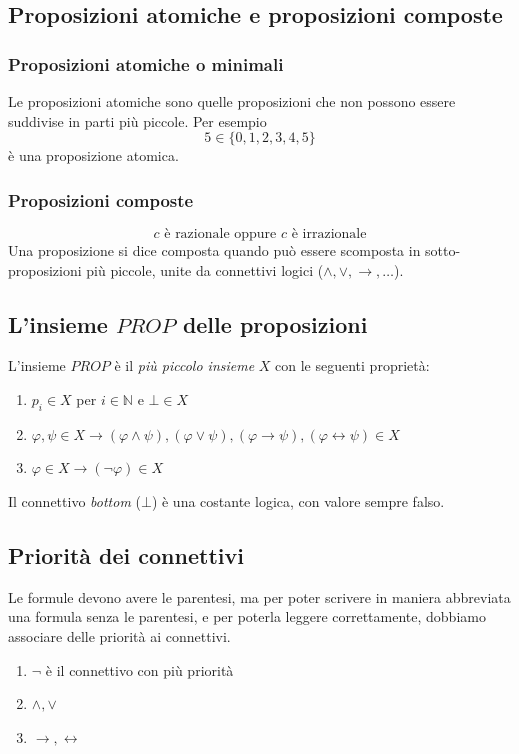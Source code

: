 \documentclass[a4paper,12pt]{report}
\begin{document}
\subsection{Proposizioni atomiche e proposizioni composte}
\subsubsection{Proposizioni atomiche o minimali}
Le proposizioni atomiche sono quelle proposizioni che non possono essere suddivise in parti pi\`{u} piccole. Per esempio \[ 5 \in \{0, 1, 2, 3, 4, 5\} \]
\`{e} una proposizione atomica.

\subsubsection{Proposizioni composte} 
\[ c \text{ \`{e} razionale oppure $c$ \`{e} irrazionale} \]
Una proposizione si dice composta quando pu\`{o} essere scomposta in sotto-proposizioni pi\`{u} piccole, unite da connettivi logici ($\wedge, \lor, \to, \dots $).

\subsection{L'insieme $PROP$ delle proposizioni}
L'insieme $PROP$ \`{e} il \emph{pi\`{u} piccolo insieme} $X$ con le seguenti propriet\`{a}:
\begin{enumerate}
\item $p_i \in X$ per $i \in \mathbb{N}$ e $\bot \in X$
\item $\varphi, \psi \in X \to (\varphi \wedge \psi), (\varphi \lor \psi), (\varphi \to \psi) , (\varphi \leftrightarrow \psi) \in X$
\item $\varphi \in X \to (\neg\varphi) \in X$
\end{enumerate}
Il connettivo \emph{bottom} ($\bot$) \`{e} una costante logica, con valore sempre falso.

\subsection{Priorit\`{a} dei connettivi}
Le formule devono avere le parentesi, ma per poter scrivere in maniera abbreviata una formula senza le parentesi, e per poterla leggere correttamente, dobbiamo associare delle priorit\`{a} ai connettivi.
\begin{enumerate}
\item $\neg$ \`{e} il connettivo con pi\`{u} priorit\`{a}
\item $\wedge, \lor$
\item $\to, \leftrightarrow$
\end{enumerate}
\end{document}
